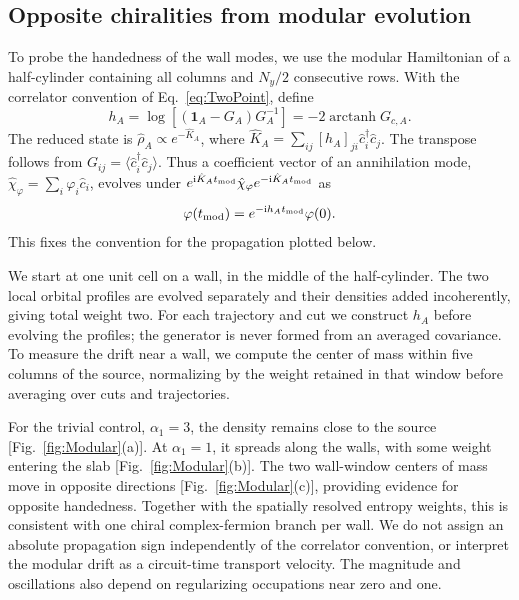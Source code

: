 \documentclass[aps,prb,10pt,twocolumn,superscriptaddress,longbibliography,floatfix]{revtex4-2}
\DeclareMathOperator\arctanh{arctanh}
\newcommand{\ii}{\mathrm{i}}
\newcommand{\Id}{\mathbf{1}}
\begin{document}
{\color{blue}
\subsection{Opposite chiralities from modular evolution}
\label{sec:ModularEvolution}

To probe the handedness of the wall modes, we use the modular Hamiltonian of a half-cylinder containing all columns and $N_y/2$ consecutive rows. With the correlator convention of Eq.~\eqref{eq:TwoPoint}, define
\begin{equation}
 h_A=\log[(\Id_A-G_A)G_A^{-1}]=-2\arctanh G_{c,A}.
 \label{eq:ModularHamiltonian}
\end{equation}
The reduced state is $\hat\rho_A\propto e^{-\hat K_A}$, where $\hat K_A=\sum_{ij}[h_A]_{ji}\hat c_i^\dagger\hat c_j$. The transpose follows from $G_{ij}=\langle\hat c_i^\dagger\hat c_j\rangle$. Thus a coefficient vector of an annihilation mode, $\hat\chi_\varphi=\sum_i\varphi_i\hat c_i$, evolves under $e^{\ii\hat K_A t_{\rm mod}}\hat\chi_\varphi e^{-\ii\hat K_A t_{\rm mod}}$ as
\begin{equation}
 \varphi(t_{\rm mod})=e^{-\ii h_A t_{\rm mod}}\varphi(0).
 \label{eq:ModularEvolution}
\end{equation}
This fixes the convention for the propagation plotted below.

We start at one unit cell on a wall, in the middle of the half-cylinder. The two local orbital profiles are evolved separately and their densities added incoherently, giving total weight two. For each trajectory and cut we construct $h_A$ before evolving the profiles; the generator is never formed from an averaged covariance. To measure the drift near a wall, we compute the center of mass within five columns of the source, normalizing by the weight retained in that window before averaging over cuts and trajectories.

For the trivial control, $\alpha_1=3$, the density remains close to the source [Fig.~\ref{fig:Modular}(a)]. At $\alpha_1=1$, it spreads along the walls, with some weight entering the slab [Fig.~\ref{fig:Modular}(b)]. The two wall-window centers of mass move in opposite directions [Fig.~\ref{fig:Modular}(c)], providing evidence for opposite handedness. Together with the spatially resolved entropy weights, this is consistent with one chiral complex-fermion branch per wall. We do not assign an absolute propagation sign independently of the correlator convention, or interpret the modular drift as a circuit-time transport velocity. The magnitude and oscillations also depend on regularizing occupations near zero and one.
}
\end{document}
